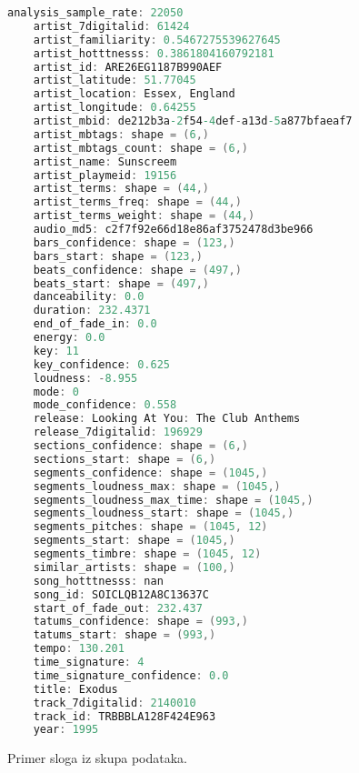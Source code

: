 \begin{figure}[H]
\lstset{style=mystyle}
\begin{lstlisting}[language=C, basicstyle=\footnotesize]
    analysis_sample_rate: 22050
    artist_7digitalid: 61424
    artist_familiarity: 0.5467275539627645
    artist_hotttnesss: 0.3861804160792181
    artist_id: ARE26EG1187B990AEF
    artist_latitude: 51.77045
    artist_location: Essex, England
    artist_longitude: 0.64255
    artist_mbid: de212b3a-2f54-4def-a13d-5a877bfaeaf7
    artist_mbtags: shape = (6,)
    artist_mbtags_count: shape = (6,)
    artist_name: Sunscreem
    artist_playmeid: 19156
    artist_terms: shape = (44,)
    artist_terms_freq: shape = (44,)
    artist_terms_weight: shape = (44,)
    audio_md5: c2f7f92e66d18e86af3752478d3be966
    bars_confidence: shape = (123,)
    bars_start: shape = (123,)
    beats_confidence: shape = (497,)
    beats_start: shape = (497,)
    danceability: 0.0
    duration: 232.4371
    end_of_fade_in: 0.0
    energy: 0.0
    key: 11
    key_confidence: 0.625
    loudness: -8.955
    mode: 0
    mode_confidence: 0.558
    release: Looking At You: The Club Anthems
    release_7digitalid: 196929
    sections_confidence: shape = (6,)
    sections_start: shape = (6,)
    segments_confidence: shape = (1045,)
    segments_loudness_max: shape = (1045,)
    segments_loudness_max_time: shape = (1045,)
    segments_loudness_start: shape = (1045,)
    segments_pitches: shape = (1045, 12)
    segments_start: shape = (1045,)
    segments_timbre: shape = (1045, 12)
    similar_artists: shape = (100,)
    song_hotttnesss: nan
    song_id: SOICLQB12A8C13637C
    start_of_fade_out: 232.437
    tatums_confidence: shape = (993,)
    tatums_start: shape = (993,)
    tempo: 130.201
    time_signature: 4
    time_signature_confidence: 0.0
    title: Exodus
    track_7digitalid: 2140010
    track_id: TRBBBLA128F424E963
    year: 1995
\end{lstlisting}
\label{primer:Song}
\caption{Primer sloga iz skupa podataka.}
\end{figure}
